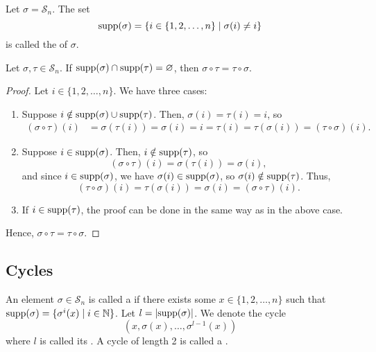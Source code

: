 \begin{defn}
Let $ \sigma=\mathcal{S}_n $. The set
\begin{equation*}
    \operatorname{supp}(\sigma)=\{i\in\{1,2,\ldots,n\}\mid\sigma(i)\neq i\}
\end{equation*}
is called the  of $ \sigma $.
\end{defn}

\begin{prop}
Let $ \sigma,\tau\in\mathcal{S}_n $. If $ \operatorname{supp}(\sigma)\cap\operatorname{supp}(\tau)=\varnothing $, then $ \sigma\circ\tau=\tau\circ\sigma $.
\end{prop}
\begin{proof}
Let $ i\in\{1,2,\ldots,n\} $. We have three cases:
\begin{enumerate}
    \item Suppose $ i\notin\operatorname{supp}(\sigma)\cup\operatorname{supp}(\tau) $. Then, $ \sigma(i)=\tau(i)=i $, so
    \begin{align*}
        (\sigma\circ\tau)(i) &= \sigma(\tau(i))=\sigma(i)=i=\tau(i)=\tau(\sigma(i))=(\tau\circ\sigma)(i).
    \end{align*}

    \item Suppose $ i\in\operatorname{supp}(\sigma) $. Then, $ i\notin\operatorname{supp}(\tau) $, so
    \begin{equation*}
        (\sigma\circ\tau)(i)=\sigma(\tau(i))=\sigma(i),
    \end{equation*}
    and since $ i\in\operatorname{supp}(\sigma) $, we have $ \sigma(i)\in\operatorname{supp}(\sigma) $, so $ \sigma(i)\notin\operatorname{supp}(\tau) $. Thus,
    \begin{equation*}
        (\tau\circ\sigma)(i)=\tau(\sigma(i))=\sigma(i)=(\sigma\circ\tau)(i).
    \end{equation*}

    \item If $ i\in\operatorname{supp}(\tau) $, the proof can be done in the same way as in the above case.
\end{enumerate}
Hence, $ \sigma\circ\tau=\tau\circ\sigma $.
\end{proof}

\subsection*{Cycles}

\begin{defn}
An element $ \sigma\in\mathcal{S}_n $ is called a  if there exists some $ x\in\{1,2,\ldots,n\} $ such that $ \operatorname{supp}(\sigma)=\{\sigma^i(x)\mid i\in\mathbb{N}\} $. Let $ l=\lvert\operatorname{supp}(\sigma)\rvert $. We denote the cycle
\begin{equation*}
    \left(x,\sigma(x),\ldots,\sigma^{l-1}(x)\right)
\end{equation*}
where $ l $ is called its . A cycle of length 2 is called a .
\end{defn}

